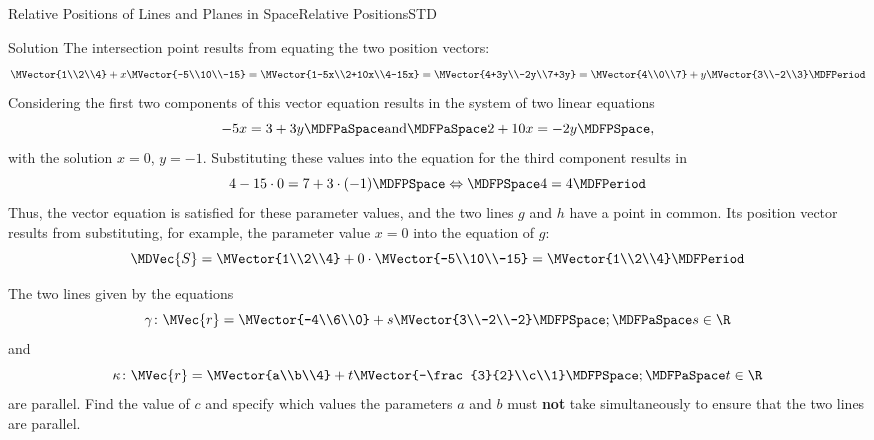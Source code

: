 \begin{MXContent}{Relative Positions of Lines and Planes in Space}{Relative Positions}{STD}
\begin{MExercise}
\begin{MHint}{Solution}
The intersection point results from equating the two position vectors:
\[
 \MVector{1\\2\\4}+x\MVector{-5\\10\\-15}=\MVector{1-5x\\2+10x\\4-15x}=\MVector{4+3y\\-2y\\7+3y}=\MVector{4\\0\\7}+y\MVector{3\\-2\\3}\MDFPeriod
\]
Considering the first two components of this vector equation results in the system of two linear equations
\[
 -5x=3+3y\MDFPaSpace\textrm{and}\MDFPaSpace 2+10x=-2y \MDFPSpace,
\]
with the solution $x=0$, $y=-1$. Substituting these values into the equation for the third component results in 
\[
 4-15\cdot 0=7+3\cdot(-1)\MDFPSpace\Leftrightarrow\MDFPSpace 4=4 \MDFPeriod
\]
Thus, the vector equation is satisfied for these parameter values, and the two lines $g$ and $h$ have a point in 
common. Its position vector results from substituting, for example, the parameter value $x=0$ into the equation of 
$g$:
\[
 \MDVec{S}=\MVector{1\\2\\4}+0\cdot\MVector{-5\\10\\-15}=\MVector{1\\2\\4}\MDFPeriod
\]
\end{MHint}
\end{MExercise}


\begin{MExercise}
The two lines given by the equations 
\[
 \gamma\colon\MVec{r}=\MVector{-4\\6\\0}+s\MVector{3\\-2\\-2}\MDFPSpace;\MDFPaSpace s\in\R 
\]
and
\[
 \kappa\colon\MVec{r}=\MVector{a\\b\\4}+t\MVector{-\frac{3}{2}\\c\\1}\MDFPSpace;\MDFPaSpace t\in\R 
\]
are parallel. Find the value of $c$ and specify which values the parameters $a$ and $b$ 
must \textbf{not} take simultaneously to ensure that the two lines are parallel.


\end{MExercise}
\end{MXContent}
